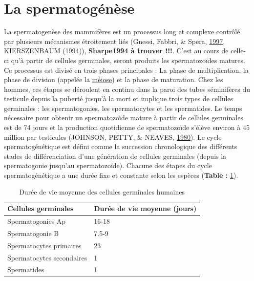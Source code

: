 \documentclass[12pt,twoside]{reedthesis}
\theoremstyle{definition}
\theoremstyle{definition}
\theoremstyle{remark}
\begin{document}
  \section{La spermatogénèse}\label{la-spermatogenese}
  
  La spermatogenèse des mammifères est un processus long et complexe
  contrôlé par plusieurs mécanismes étroitement liés (Gnessi, Fabbri, \&
  Spera, \protect\hyperlink{ref-Gnessi1997}{1997}, KIERSZENBAUM
  (\protect\hyperlink{ref-KIERSZENBAUM1994}{1994})), \textbf{Sharpe1994 à
  trouver !!!}. C'est au cours de celle-ci qu'à partir de cellules
  germinales, seront produits les spermatozoïdes matures. Ce processus est
  divisé en trois phases principales : La phase de multiplication, la
  phase de division (appelée la \protect\hyperlink{meiose}{méiose}) et la
  phase de maturation. Chez les hommes, ces étapes se déroulent en continu
  dans la paroi des tubes séminifères du testicule depuis la puberté
  jusqu'à la mort et implique trois types de cellules germinales : les
  spermatogonies, les spermatocytes et les spermatides. Le temps
  nécessaire pour obtenir un spermatozoïde mature à partir de cellules
  germinales est de 74 jours et la production quotidienne de spermatozoïde
  s'élève environ à 45 million par testicules (JOHNSON, PETTY, \& NEAVES,
  \protect\hyperlink{ref-Johnson1980}{1980}). Le cycle spermatogénétique
  est défini comme la succession chronologique des différents stades de
  différenciation d'une génération de cellules germinales (depuis la
  spermatogonie jusqu'au spermatozoïde). Chacune des étapes du cycle
  spermatogénétique a une durée fixe et constante selon les espèces
  (\textbf{Table : }\ref{tab:spermatotime}).
  
  \begin{table}
  
  \caption{\label{tab:spermatotime}Durée de vie moyenne des cellules germinales humaines}
  \centering
  \begin{tabular}[t]{l|l}
  \hline
  Cellules germinales & Durée de vie moyenne (jours)\\
  \hline
  Spermatogonies Ap & 16-18\\
  \hline
  Spermatogonie B & 7.5-9\\
  \hline
  Spermatocytes primaires & 23\\
  \hline
  Spermatocytes secondaires & 1\\
  \hline
  Spermatides & 1\\
  \hline
  \end{tabular}
  \end{table}
  
\end{document}
